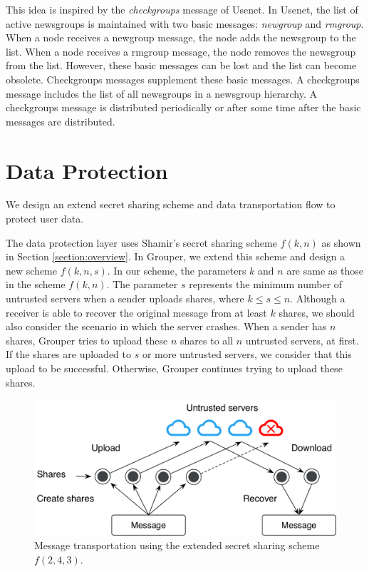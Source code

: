\documentclass[a4paper,11pt]{report}
\begin{document}
This idea is inspired by the \emph{checkgroups} message of Usenet\cite{usenet}.
In Usenet, the list of active newsgroups is maintained with two basic messages: \emph{newgroup} and \emph{rmgroup}.
When a node receives a newgroup message, the node adds the newsgroup to the list.
When a node receives a rmgroup message, the node removes the newsgroup from the list.
However, these basic messages can be lost and the list can become obsolete.
Checkgroups messages supplement these basic messages.
A checkgroups message includes the list of all newsgroups in a newsgroup hierarchy.
A checkgroups message is distributed periodically or after some time after the basic messages are distributed.

\section{Data Protection}  \label{section:data_protection}

We design an extend secret sharing scheme and data transportation flow to protect user data.

The data protection layer uses Shamir's secret sharing scheme $f(k, n)$ as shown in Section \ref{section:overview}.
In Grouper, we extend this scheme and design a new scheme $ f(k, n, s)$.
In our scheme, the parameters $k$ and $n$ are same as those in the scheme $f(k, n)$. 
The parameter $s$ represents the minimum number of untrusted servers when a sender uploads shares, where $k \leq s \leq n$.
Although a receiver is able to recover the original message from at least $k$ shares, we should also consider the scenario in which the server crashes. 
When a sender has $n$ shares, Grouper tries to upload these $n$ shares to all $n$ untrusted servers, at first. 
If the shares are uploaded to $s$ or more untrusted servers, we consider that this upload to be successful.
Otherwise, Grouper continues trying to upload these shares.

\begin{figure}[t]
	\centering
	\includegraphics[scale=0.6]{transportation}
	\caption{Message transportation using the extended secret sharing scheme $f(2, 4, 3)$.}
	\label{fig:transportation}
\end{figure}
\end{document}
